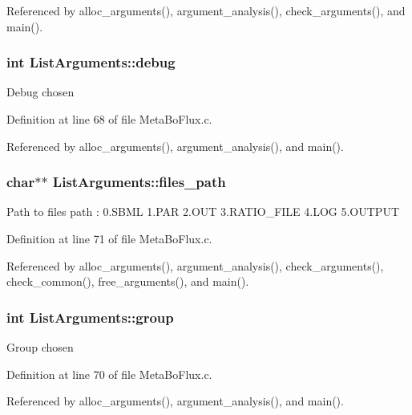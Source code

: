 Referenced by alloc\_\-arguments(), argument\_\-analysis(), check\_\-arguments(), and main().

\hypertarget{structListArguments_a227eea65bc99120840063486d602fcbb}{
\subsubsection[{debug}]{\setlength{\rightskip}{0pt plus 5cm}int {\bf ListArguments::debug}}}
\label{structListArguments_a227eea65bc99120840063486d602fcbb}
Debug chosen 

Definition at line 68 of file MetaBoFlux.c.



Referenced by alloc\_\-arguments(), argument\_\-analysis(), and main().

\hypertarget{structListArguments_a06c7f7a5dee18ad6974749e892e01178}{
\subsubsection[{files\_\-path}]{\setlength{\rightskip}{0pt plus 5cm}char$\ast$$\ast$ {\bf ListArguments::files\_\-path}}}
\label{structListArguments_a06c7f7a5dee18ad6974749e892e01178}
Path to files path : 0.SBML 1.PAR 2.OUT 3.RATIO\_\-FILE 4.LOG 5.OUTPUT 

Definition at line 71 of file MetaBoFlux.c.



Referenced by alloc\_\-arguments(), argument\_\-analysis(), check\_\-arguments(), check\_\-common(), free\_\-arguments(), and main().

\hypertarget{structListArguments_a6e6b46a5655953f6a68b5cd31da094fd}{
\subsubsection[{group}]{\setlength{\rightskip}{0pt plus 5cm}int {\bf ListArguments::group}}}
\label{structListArguments_a6e6b46a5655953f6a68b5cd31da094fd}
Group chosen 

Definition at line 70 of file MetaBoFlux.c.



Referenced by alloc\_\-arguments(), argument\_\-analysis(), and main().

